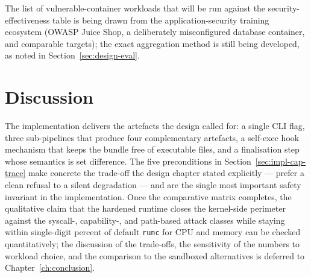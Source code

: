 The list of vulnerable-container workloads that will be run against the security-effectiveness table is being drawn from the application-security training ecosystem (OWASP Juice Shop, a deliberately misconfigured database container, and comparable targets); the exact aggregation method is still being developed, as noted in Section~\ref{sec:design-eval}.

\section{Discussion}\label{sec:impl-discussion}

The implementation delivers the artefacts the design called for: a single CLI flag, three sub-pipelines that produce four complementary artefacts, a self-exec hook mechanism that keeps the bundle free of executable files, and a finalisation step whose semantics is set difference. The five preconditions in Section~\ref{sec:impl-cap-trace} make concrete the trade-off the design chapter stated explicitly --- prefer a clean refusal to a silent degradation --- and are the single most important safety invariant in the implementation. Once the comparative matrix completes, the qualitative claim that the hardened runtime closes the kernel-side perimeter against the syscall-, capability-, and path-based attack classes while staying within single-digit percent of default \texttt{runc} for CPU and memory can be checked quantitatively; the discussion of the trade-offs, the sensitivity of the numbers to workload choice, and the comparison to the sandboxed alternatives is deferred to Chapter~\ref{ch:conclusion}.
